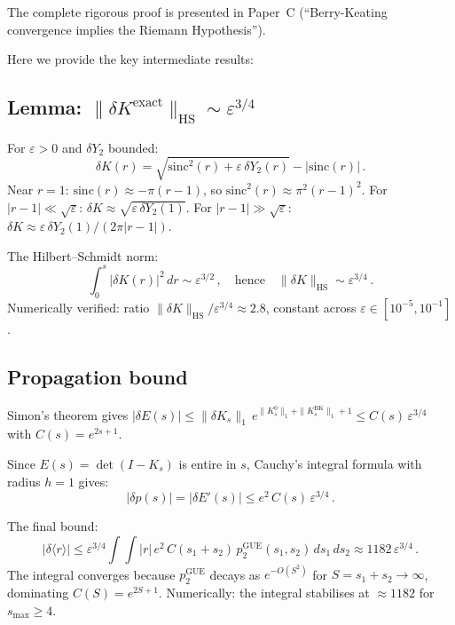 \documentclass[10pt]{article}
\begin{document}
The complete rigorous proof is presented in Paper~C
(``Berry-Keating convergence implies the Riemann Hypothesis'').

Here we provide the key intermediate results:

\subsection{Lemma: $\|\delta K^{\mathrm{exact}}\|_{\mathrm{HS}} \sim \varepsilon^{3/4}$}

For $\varepsilon > 0$ and $\delta Y_2$ bounded:
\begin{equation}
\delta K(r) = \sqrt{\mathrm{sinc}^2(r) + \varepsilon\,\delta Y_2(r)} - |\mathrm{sinc}(r)|\,.
\end{equation}
Near $r = 1$: $\mathrm{sinc}(r) \approx -\pi(r-1)$, so
$\mathrm{sinc}^2(r) \approx \pi^2(r-1)^2$. For $|r-1| \ll \sqrt{\varepsilon}$:
$\delta K \approx \sqrt{\varepsilon\,\delta Y_2(1)}$. For $|r-1| \gg \sqrt{\varepsilon}$:
$\delta K \approx \varepsilon\,\delta Y_2(1)/(2\pi|r-1|)$.

The Hilbert--Schmidt norm:
\begin{equation}
\int_0^s |\delta K(r)|^2\,dr \sim \varepsilon^{3/2}\,,
\quad\text{hence}\quad \|\delta K\|_{\mathrm{HS}} \sim \varepsilon^{3/4}\,.
\end{equation}
Numerically verified: ratio $\|\delta K\|_{\mathrm{HS}} / \varepsilon^{3/4}
\approx 2.8$, constant across $\varepsilon \in [10^{-5}, 10^{-1}]$.

\subsection{Propagation bound}

Simon's theorem gives $|\delta E(s)| \leq \|\delta K_s\|_1\,e^{\|K^0_s\|_1 + \|K^{\mathrm{BK}}_s\|_1 + 1}
\leq C(s)\,\varepsilon^{3/4}$ with $C(s) = e^{2s+1}$.

Since $E(s) = \det(I - K_s)$ is entire in $s$, Cauchy's integral formula with
radius $h = 1$ gives:
\begin{equation}
|\delta p(s)| = |\delta E'(s)| \leq e^2\,C(s)\,\varepsilon^{3/4}\,.
\end{equation}

The final bound:
\begin{equation}
|\delta\langle r\rangle| \leq \varepsilon^{3/4} \int\!\!\int |r|\,e^2\,C(s_1{+}s_2)\,
p_2^{\mathrm{GUE}}(s_1, s_2)\,ds_1\,ds_2 \approx 1182\,\varepsilon^{3/4}\,.
\end{equation}
The integral converges because $p_2^{\mathrm{GUE}}$ decays as $e^{-O(S^2)}$
for $S = s_1 + s_2 \to \infty$, dominating $C(S) = e^{2S+1}$.
Numerically: the integral stabilises at $\approx 1182$ for $s_{\max} \geq 4$.
\end{document}
